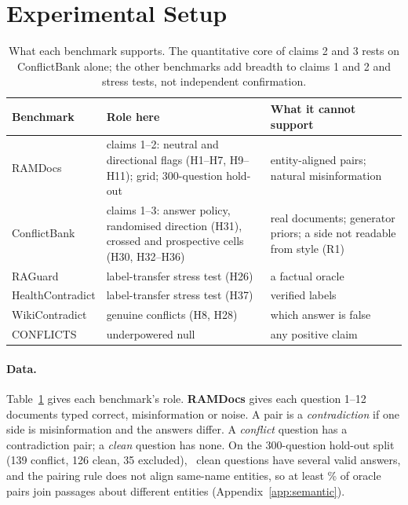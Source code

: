 \section{Experimental Setup}
\label{sec:setup}

\begin{table}[t]
\centering\scriptsize
\setlength{\tabcolsep}{3pt}
\begin{tabular}{@{}>{\raggedright\arraybackslash}p{1.45cm}>{\raggedright\arraybackslash}p{2.95cm}>{\raggedright\arraybackslash}p{2.65cm}@{}}
\toprule
Benchmark & Role here & What it cannot support \\
\midrule
RAMDocs & claims 1--2: neutral and directional flags (H1--H7, H9--H11); grid; 300-question hold-out & entity-aligned pairs;
natural misinformation \\
ConflictBank & claims 1--3: answer policy, randomised direction (H31), crossed and prospective cells (H30,
H32--H36) & real documents; generator priors; a side not readable from style (R1) \\
RAGuard & label-transfer stress test (H26) & a factual oracle \\
Health\-Contradict & label-transfer stress test (H37) & verified labels \\
Wiki\-Contradict & genuine conflicts (H8, H28) & which answer is false \\
CONFLICTS & underpowered null & any positive claim \\
\bottomrule
\end{tabular}
\caption{What each benchmark supports. The quantitative core of claims 2 and 3 rests on ConflictBank alone; the
other benchmarks add breadth to claims 1 and 2 and stress tests, not independent confirmation.}
\label{tab:evidence}
\end{table}

\paragraph{Data.}
Table~\ref{tab:evidence} gives each benchmark's role. \textbf{RAMDocs} \citep{wang2025madam} gives each question 1--12 documents typed correct, misinformation or noise. A
pair is a \emph{contradiction} if one side is misinformation and the answers differ. A \emph{conflict} question has a
contradiction pair; a \emph{clean} question has none. On the 300-question hold-out split (139 conflict, 126 clean, 35 excluded),
\cleanTypeNSeveral\ clean questions have several valid answers, and the pairing rule does not align same-name
entities, so at least \pairCrossLbShare\% of oracle pairs join passages about different entities
(Appendix~\ref{app:semantic}).

